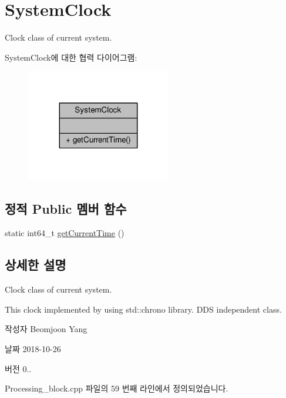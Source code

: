 \hypertarget{classSystemClock}{}\section{System\+Clock}
\label{classSystemClock}


Clock class of current system.  




System\+Clock에 대한 협력 다이어그램\+:\nopagebreak
\begin{figure}[H]
\begin{center}
\leavevmode
\includegraphics[width=179pt]{classSystemClock__coll__graph}
\end{center}
\end{figure}
\subsection*{정적 Public 멤버 함수}
\begin{DoxyCompactItemize}
\item 
static int64\+\_\+t \hyperlink{classSystemClock_ac51adb5878772576050a1c70b8994244}{get\+Current\+Time} ()
\end{DoxyCompactItemize}


\subsection{상세한 설명}
Clock class of current system. 

This clock implemented by using std\+::chrono library. D\+DS independent class. \begin{DoxyAuthor}{작성자}
Beomjoon Yang 
\end{DoxyAuthor}
\begin{DoxyDate}{날짜}
2018-\/10-\/26 
\end{DoxyDate}
\begin{DoxyVersion}{버전}
0.. 
\end{DoxyVersion}


Processing\+\_\+block.\+cpp 파일의 59 번째 라인에서 정의되었습니다.



